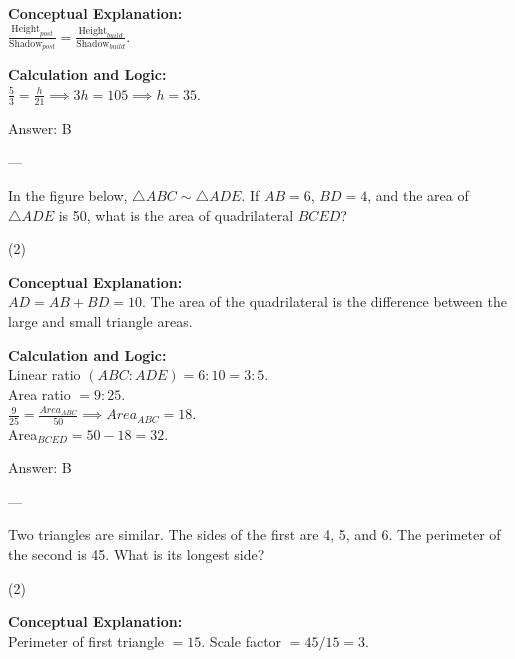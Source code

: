 \documentclass[11pt,paper=a4,answers]{exam}
\begin{document}
\begin{questions}
\begin{solution}
\textbf{Conceptual Explanation:} \\
$\frac{\text{Height}_{post}}{\text{Shadow}_{post}} = \frac{\text{Height}_{build}}{\text{Shadow}_{build}}$.

\vspace{10pt}
\textbf{Calculation and Logic:} \\
$\frac{5}{3} = \frac{h}{21} \implies 3h = 105 \implies h = 35$.

\vspace{15pt}
Answer: \colorbox{yellow!100}{B}
\end{solution}

---

\question
In the figure below, $\triangle ABC \sim \triangle ADE$. If $AB = 6$, $BD = 4$, and the area of $\triangle ADE$ is 50, what is the area of quadrilateral $BCED$?
\begin{tasks}(2)
\end{tasks}

\begin{solution}
\textbf{Conceptual Explanation:} \\
$AD = AB + BD = 10$. The area of the quadrilateral is the difference between the large and small triangle areas.

\vspace{10pt}
\textbf{Calculation and Logic:} \\
Linear ratio $(ABC:ADE) = 6:10 = 3:5$. \\
Area ratio $= 9:25$. \\
$\frac{9}{25} = \frac{Area_{ABC}}{50} \implies Area_{ABC} = 18$. \\
Area$_{BCED} = 50 - 18 = 32$.

\vspace{15pt}
Answer: \colorbox{yellow!100}{B}
\end{solution}

---

\question
Two triangles are similar. The sides of the first are 4, 5, and 6. The perimeter of the second is 45. What is its longest side?
\begin{tasks}(2)
\end{tasks}

\begin{solution}
\textbf{Conceptual Explanation:} \\
Perimeter of first triangle $= 15$. Scale factor $= 45/15 = 3$.


\end{solution}
\end{questions}
\end{document}
